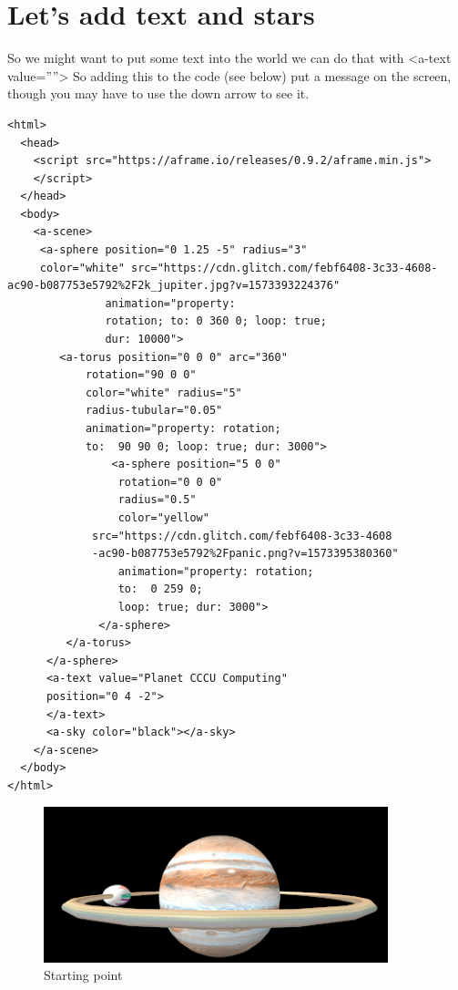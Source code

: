 \section{Let's add text and stars}
So we might want to put some text into the world we can do that with <a-text value=””> So adding this to the code (see below) put a message on the screen, though you may have to use the down arrow to see it.

\begin{lstlisting}
<html>
  <head>
    <script src="https://aframe.io/releases/0.9.2/aframe.min.js">
    </script>
  </head>
  <body>
    <a-scene>
     <a-sphere position="0 1.25 -5" radius="3" 
     color="white" src="https://cdn.glitch.com/febf6408-3c33-4608-ac90-b087753e5792%2F2k_jupiter.jpg?v=1573393224376"
               animation="property: 
               rotation; to: 0 360 0; loop: true; 
               dur: 10000">
        <a-torus position="0 0 0" arc="360"
            rotation="90 0 0"
            color="white" radius="5"
            radius-tubular="0.05"
            animation="property: rotation; 
            to:  90 90 0; loop: true; dur: 3000">
                <a-sphere position="5 0 0"
                 rotation="0 0 0"
                 radius="0.5"
                 color="yellow"
             src="https://cdn.glitch.com/febf6408-3c33-4608
             -ac90-b087753e5792%2Fpanic.png?v=1573395380360"
                 animation="property: rotation; 
                 to:  0 259 0; 
                 loop: true; dur: 3000">
              </a-sphere>
         </a-torus>
      </a-sphere>   
      <a-text value="Planet CCCU Computing" 
      position="0 4 -2">
      </a-text>
      <a-sky color="black"></a-sky>
    </a-scene>
  </body>
</html>
\end{lstlisting}

\begin{figure}
    \centering
    \includegraphics[width=10cm]{chapters/chapter2/figures/Picture1.png}
    \caption{Starting point}
    \label{fig:Planet again}
\end{figure}

